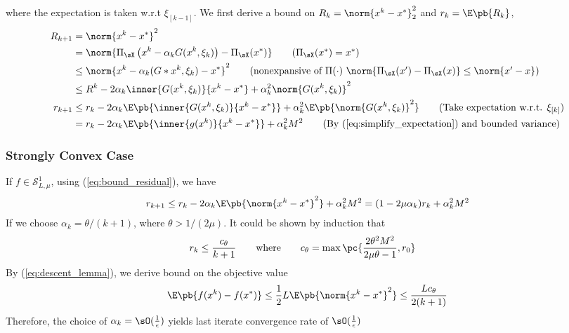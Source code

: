 \documentclass[11pt]{article}
\newcommand\scrS{\ensuremath{\mathscr{S}}}
\begin{document}
where the expectation is taken w.r.t $\xi_{[k-1]}$. We first derive a bound on $R_k = \norm{x^k-x^*}_2^2$ and $r_k = \E\pb{R_k}$,
\begin{align*}
    R_{k+1}
        &= \norm{x^k-x^*}^2 \\
        &= \norm{ \Pi_{\sX}\left( x^k - \alpha_k G(x^k,\xi_k) \right) - \Pi_{\sX}(x^*)  }
            \tag{$\Pi_{\sX}(x^*) = x^*$} \\
        &\leq \norm{ x^k - \alpha_k(G*x^k,\xi_k) - x^* }^2
            \tag{nonexpansive of $\Pi(\cdot)$ $\norm{\Pi_{\sX}(x')-\Pi_{\sX}(x)} \leq \norm{x'-x}$} \\ 
        &\leq R^k - 2\alpha_k\inner{G(x^k,\xi_k)}{x^k-x^*} + \alpha_k^2\norm{G(x^k,\xi_k)}^2 \\
    r_{k+1}
        &\leq r_k - 2\alpha_k \E\pb{ \inner{G(x^k,\xi_k)}{x^k-x^*} } + \alpha_k^2 \E\pb{ \norm{G(x^k,\xi_k)}^2 }
            \tag{Take expectation w.r.t. $\xi_{[k]}$} \\
        &= r_k - 2\alpha_k \E\pb{\inner{g(x^k)}{x^k-x^*}} + \alpha_k^2 M^2
            \tag{By (\ref{eq:simplify_expectation}) and bounded variance}
\end{align*}

\subsubsection{Strongly Convex Case}

If $f\in\scrS_{L,\mu}^1$, using (\ref{eq:bound_residual}), we have
\begin{align*}
    r_{k+1}
        \leq r_k - 2\alpha_k \E\pb{\norm{x^k-x^*}^2} + \alpha_k^2 M^2
        = (1-2\mu \alpha_k ) r_k + \alpha_k^2M^2
\end{align*}
If we choose $\alpha_k = \theta/(k+1)$, where $\theta > 1/(2\mu)$. It could be shown by induction that
\begin{align*}
    r_k 
        &\leq \frac{c_{\theta}}{k+1}
            \quad\quad\text{where}\quad\quad
            c_{\theta} = \max\pc{
                \frac{2\theta^2M^2}{2\mu\theta - 1}, r_0
            }
\end{align*}
By (\ref{eq:descent_lemma}), we derive bound on the objective value
\begin{align*}
    \E\pb{f(x^k) - f(x^*)}
        \leq \frac{1}{2} L \E\pb{\norm{x^k-x^*}^2}
        \leq \frac{Lc_{\theta}}{2(k+1)}
\end{align*}
Therefore, the choice of $\alpha_k=\sO(\frac{1}{\epsilon})$ yields last iterate convergence rate of $\sO(\frac{1}{\epsilon})$
\end{document}

